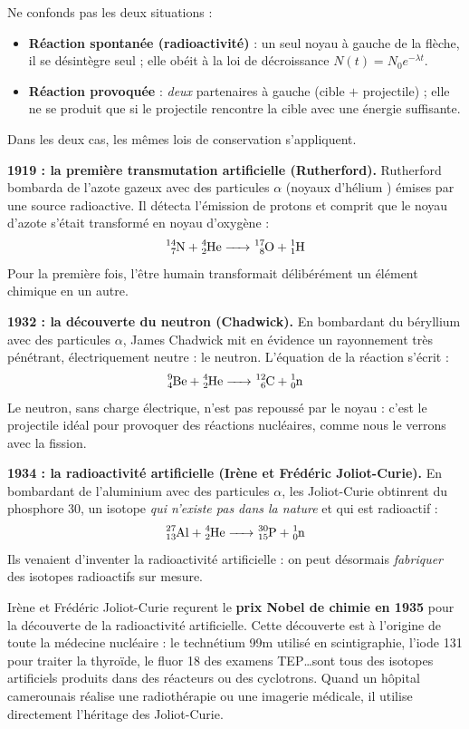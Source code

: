 \documentclass[11pt]{article}
\newcommand{\cle}[1]{{\popxbold\color{popdark}#1}}
\newcounter{popsec}
\newcounter{popsub}
\newcommand{\courssub}[1]{%
  \stepcounter{popsub}%
  \par\vspace{9pt}\noindent{\popxbold\fontsize{11.5}{13}\selectfont\color{popink}{\color{poporange}\thepopsec.\thepopsub}\hspace{6pt}#1}\par\nopagebreak\vspace{4pt}
}
\begin{document}
\begin{attention}
Ne confonds pas les deux situations :
\begin{itemize}
\item \textbf{Réaction spontanée (radioactivité)} : un seul noyau à gauche de la flèche, il se désintègre seul ; elle obéit à la loi de décroissance $N(t) = N_0 e^{-\lambda t}$.
\item \textbf{Réaction provoquée} : \emph{deux} partenaires à gauche (cible $+$ projectile) ; elle ne se produit que si le projectile rencontre la cible avec une énergie suffisante.
\end{itemize}
Dans les deux cas, les mêmes lois de conservation s'appliquent.
\end{attention}

\courssub{Les grandes étapes historiques}

\textbf{1919 : la première transmutation artificielle (Rutherford).} Rutherford bombarda de l'azote gazeux avec des particules $\alpha$ (noyaux d'hélium ) émises par une source radioactive. Il détecta l'émission de protons et comprit que le noyau d'azote s'était transformé en noyau d'oxygène :
\[
\ce{^{14}_{7}N + ^{4}_{2}He -> ^{17}_{8}O + ^{1}_{1}H}
\]
Pour la première fois, l'être humain transformait délibérément un élément chimique en un autre.

\textbf{1932 : la découverte du neutron (Chadwick).} En bombardant du béryllium avec des particules $\alpha$, James Chadwick mit en évidence un rayonnement très pénétrant, électriquement neutre : le \cle{neutron}. L'équation de la réaction s'écrit :
\[
\ce{^{9}_{4}Be + ^{4}_{2}He -> ^{12}_{6}C + ^{1}_{0}n}
\]
Le neutron, sans charge électrique, n'est pas repoussé par le noyau : c'est le projectile idéal pour provoquer des réactions nucléaires, comme nous le verrons avec la fission.

\textbf{1934 : la radioactivité artificielle (Irène et Frédéric Joliot-Curie).} En bombardant de l'aluminium avec des particules $\alpha$, les Joliot-Curie obtinrent du phosphore 30, un isotope \emph{qui n'existe pas dans la nature} et qui est radioactif :
\[
\ce{^{27}_{13}Al + ^{4}_{2}He -> ^{30}_{15}P + ^{1}_{0}n}
\]
Ils venaient d'inventer la \cle{radioactivité artificielle} : on peut désormais \emph{fabriquer} des isotopes radioactifs sur mesure.

\begin{savaistu}
Irène et Frédéric Joliot-Curie reçurent le \textbf{prix Nobel de chimie en 1935} pour la découverte de la radioactivité artificielle. Cette découverte est à l'origine de toute la \cle{médecine nucléaire} : le technétium 99m utilisé en scintigraphie, l'iode 131 pour traiter la thyroïde, le fluor 18 des examens TEP\ldots sont tous des isotopes artificiels produits dans des réacteurs ou des cyclotrons. Quand un hôpital camerounais réalise une radiothérapie ou une imagerie médicale, il utilise directement l'héritage des Joliot-Curie.
\end{savaistu}
\end{document}
